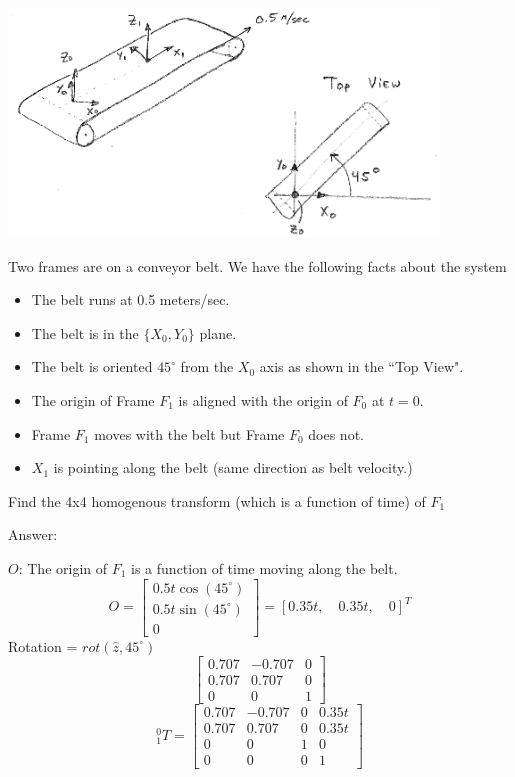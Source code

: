 \begin{Example}

\includegraphics[width=4.5in]{figs02/00578.eps}

Two frames are on a conveyor belt.  We have the following facts about the system
\begin{itemize}
  \item The belt runs at 0.5 meters/sec.
  \item The belt is in the $\{X_0,Y_0\}$ plane.
  \item The belt is oriented $45^\circ$ from the $X_0$ axis as shown in the ``Top View".
  \item The origin of Frame $F_1$ is aligned with the origin of $F_0$ at $t=0$.
  \item Frame $F_1$ moves with the belt but Frame $F_0$ does not.
  \item $X_1$ is pointing along the belt (same direction as belt velocity.)
\end{itemize}

Find the 4x4 homogenous transform (which is a function of time) of $F_1$

Answer:

$O$:  The origin of $F_1$ is a function of time moving along the belt.
\[
O = \begin{bmatrix} 0.5t \cos(45^\circ) \\ 0.5t\sin(45^\circ) \\ 0 \end{bmatrix} = [0.35t, \quad 0.35t, \quad 0]^T
\]
Rotation = $rot(\hat{z}, 45^\circ)$
\[
\begin{bmatrix} 0.707 & -0.707 & 0 \\ 0.707 & 0.707 & 0 \\ 0 & 0 & 1 \end{bmatrix}
\]
\[
{^0_1T} = \begin{bmatrix} 0.707 & -0.707 & 0 & 0.35t \\ 0.707 & 0.707 & 0 & 0.35t \\ 0 & 0 & 1 & 0 \\ 0 & 0 & 0 & 1 \end{bmatrix}
\]
\end{Example}


